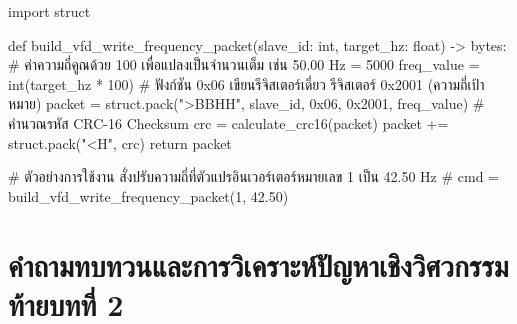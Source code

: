 \begin{pythonbox}
import struct

def build_vfd_write_frequency_packet(slave_id: int, target_hz: float) -> bytes:
    # ค่าความถี่คูณด้วย 100 เพื่อแปลงเป็นจำนวนเต็ม เช่น 50.00 Hz = 5000
    freq_value = int(target_hz * 100)
    # ฟังก์ชัน 0x06 เขียนรีจิสเตอร์เดี่ยว รีจิสเตอร์ 0x2001 (ความถี่เป้าหมาย)
    packet = struct.pack(">BBHH", slave_id, 0x06, 0x2001, freq_value)
    # คำนวณรหัส CRC-16 Checksum
    crc = calculate_crc16(packet)
    packet += struct.pack("<H", crc)
    return packet

# ตัวอย่างการใช้งาน สั่งปรับความถี่ที่ตัวแปรอินเวอร์เตอร์หมายเลข 1 เป็น 42.50 Hz
# cmd = build_vfd_write_frequency_packet(1, 42.50)
\end{pythonbox}

\section*{คำถามทบทวนและการวิเคราะห์ปัญหาเชิงวิศวกรรมท้ายบทที่ 2}

